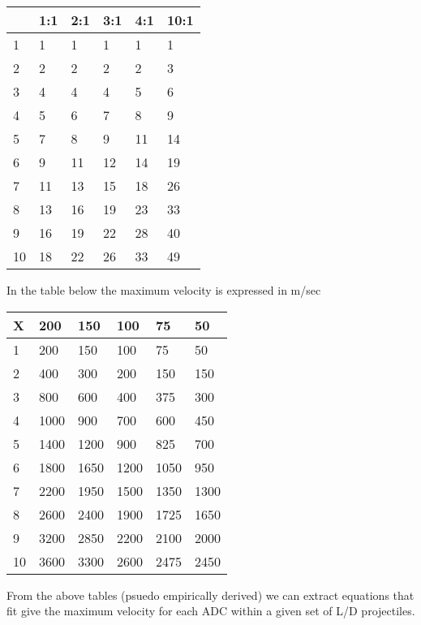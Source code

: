 \begin{tabular}{llllll} \hline 
     &  1:1   &   2:1  &    3:1   &   4:1  &   10:1  \\ \hline
1    &    1   &     1  &      1   &     1  &      1  \\
2    &    2   &     2  &      2   &     2  &      3  \\
3    &    4   &     4  &      4   &     5  &      6  \\
4    &    5   &     6  &      7   &     8  &      9  \\
5    &    7   &     8  &      9   &    11  &     14  \\
6    &    9   &    11  &     12   &    14  &     19  \\
7    &   11   &    13  &     15   &    18  &     26  \\
8    &   13   &    16  &     19   &    23  &     33  \\
9    &   16   &    19  &     22   &    28  &     40  \\
10   &   18   &    22  &     26   &    33  &     49  \\ \hline 
\end{tabular}
   
In the table below the maximum velocity is expressed in m/sec

\begin{tabular}{llllll} \hline 
X &     200 &      150 &     100 &      75 &      50 \\ \hline
1 &     200 &      150 &     100 &      75 &      50 \\
2 &     400 &      300 &     200 &     150 &     150 \\
3 &     800 &      600 &     400 &     375 &     300 \\
4 &    1000 &      900 &     700 &     600 &     450 \\
5 &    1400 &     1200 &     900 &     825 &     700 \\
6 &    1800 &     1650 &    1200 &    1050 &     950 \\
7 &    2200 &     1950 &    1500 &    1350 &    1300 \\
8 &    2600 &     2400 &    1900 &    1725 &    1650 \\
9 &    3200 &     2850 &    2200 &    2100 &    2000 \\
10&    3600 &     3300 &    2600 &    2475 &    2450 \\ \hline 
\end{tabular}

From the above tables (psuedo empirically derived) we can extract 
equations that fit give the maximum velocity for each ADC within a
given set of L/D projectiles.

